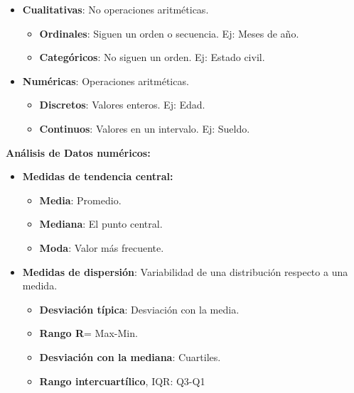 \documentclass[12pt]{report} %
\begin{document}
\begin{itemize}

\item
  \textbf{Cualitativas}: No operaciones aritméticas.

  \begin{itemize}
  
  \item
    \textbf{Ordinales}: Siguen un orden o secuencia. Ej: Meses de año.
  \item
    \textbf{Categóricos}: No siguen un orden. Ej: Estado civil.
  \end{itemize}
\item
  \textbf{Numéricas}: Operaciones aritméticas.

  \begin{itemize}
  
  \item
    \textbf{Discretos}: Valores enteros. Ej: Edad.
  \item
    \textbf{Continuos}: Valores en un intervalo. Ej: Sueldo.
  \end{itemize}
\end{itemize}

\textbf{Análisis de Datos numéricos:}

\begin{itemize}

\item
  \textbf{Medidas de tendencia central:}

  \begin{itemize}
  
  \item
    \textbf{Media}: Promedio.

    
    \item
      \textbf{Mediana}: El punto central.
    \item
      \textbf{Moda}: Valor más frecuente.
  \end{itemize}
\item
  \textbf{Medidas de dispersión}: Variabilidad de una distribución
  respecto a una medida.

  \begin{itemize}
  
  \item
    \textbf{Desviación típica}: Desviación con la media.
    
    \item
      \textbf{Rango R}= Max-Min.
    \item
      \textbf{Desviación con la mediana}: Cuartiles.
    \item
      \textbf{Rango intercuartílico}, IQR: Q3-Q1
  \end{itemize}
\end{itemize}
\end{document}
